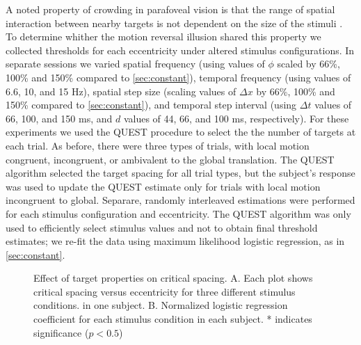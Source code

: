 \documentclass[../manuscript.tex]{subfiles}
\begin{document}
A noted property of crowding in parafoveal vision is that the range of
spatial interaction between nearby targets is not dependent on the
size of the stimuli \cite{Levi:2002cs}. To determine whither the
motion reversal illusion shared this property we collected thresholds
for each eccentricity under altered stimulus configurations. In
separate sessions we varied spatial frequency (using values of $\phi$
scaled by 66\%, 100\% and 150\% compared to \autoref{sec:constant}), temporal
frequency (using values of 6.6, 10, and 15 Hz), spatial step size
(scaling values of ${\Delta}x$ by 66\%, 100\% and 150\% compared to
\autoref{sec:constant}), and temporal step interval (using ${\Delta}t$ values of
66, 100, and 150 ms, and $d$ values of 44, 66, and 100 ms,
respectively). For these experiments we used the QUEST procedure
\cite{Watson:1983hc} to select the the number of targets at each
trial. As before, there were three types of trials, with local motion
congruent, incongruent, or ambivalent to the global translation. The
QUEST algorithm selected the target spacing for all trial types, but
the subject's response was used to update the QUEST estimate only for
trials with local motion incongruent to global. Separare, randomly
interleaved estimations were performed for each stimulus configuration
and eccentricity. The QUEST algorithm was only used to efficiently
select stimulus values and not to obtain final threshold estimates; we
re-fit the data using maximum likelihood logistic regression, as in
\autoref{sec:constant}.

\begin{figure}
  \caption{Effect of target properties on critical spacing. A. Each
    plot shows critical spacing versus eccentricity for three
    different stimulus conditions. in one subject. B. Normalized
    logistic regression coefficient for each stimulus condition in
    each subject. * indicates significance ($p < 0.5$) }
\end{figure}
\end{document}
